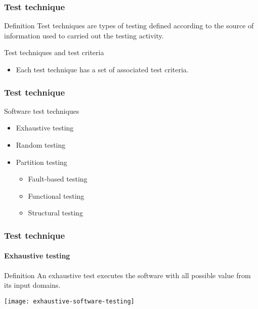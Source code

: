 \begin{frame}[parent={cmap:software-testing-foundations}, hasprev=false, hasnext=true]
\frametitle{Test technique}
\label{concept:test-technique}

\begin{block:concept}{Definition}
Test techniques are types of testing defined according to the
source of information used to carried out the testing activity.
\end{block:concept}

\begin{block:fact}{Test techniques and test criteria}
\begin{itemize}
    \item Each test technique has a set of associated test criteria.
\end{itemize}
\end{block:fact}
\end{frame}



\begin{frame}[hasprev=true, hasnext=true]
\frametitle{Test technique}

\begin{block:fact}{Software test techniques}
\begin{itemize}
	\item Exhaustive testing

	\item Random testing

	\item Partition testing
	\begin{itemize}
		\item Fault-based testing

		\item Functional testing

		\item Structural testing
	\end{itemize}
\end{itemize}
\end{block:fact}
\end{frame}



\begin{frame}
\frametitle{Test technique}
\framesubtitle{Exhaustive testing}
\label{concept:exhaustive-testing}

\begin{block:concept}{Definition}
An exhaustive test executes the software with all possible value from its
input domains.
\end{block:concept}

\begin{block:fact}{}
    \centering
    \texttt{[image: exhaustive-software-testing]}
\end{block:fact}

\hfill
{}
\end{frame}



